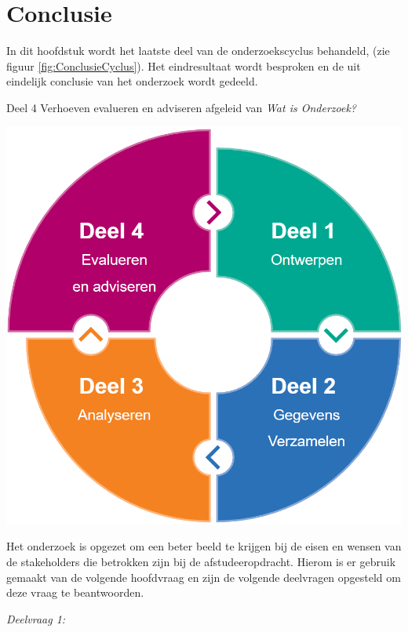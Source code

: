 \chapter{Conclusie}
In dit hoofdstuk wordt het laatste deel van de onderzoekscyclus behandeld,  (zie figuur \ref{fig:ConclusieCyclus}).
Het eindresultaat wordt besproken en de uit eindelijk conclusie van het onderzoek wordt gedeeld.

\begin{graphic}
	\vspace{0.2cm}
	\captionsetup{type=figure}
	\caption{Deel 4 Verhoeven evalueren en adviseren afgeleid van \textit{Wat is Onderzoek?}}
	\includegraphics[scale=0.3]{img/EvaluerenCyclus.png}
	\label{fig:ConclusieCyclus}
	\vspace{0.2cm}
\end{graphic}

\whitespace
Het onderzoek is opgezet om een beter beeld te krijgen bij de eisen en wensen van de stakeholders die betrokken zijn bij de afstudeeropdracht.
Hierom is er gebruik gemaakt van de volgende hoofdvraag \qw{\textit{\MainQuestion}} en zijn de volgende deelvragen opgesteld om deze vraag te beantwoorden.
\newpage

\begin{center}
	\textit{Deelvraag 1: \SubquestionOne}
\end{center}

